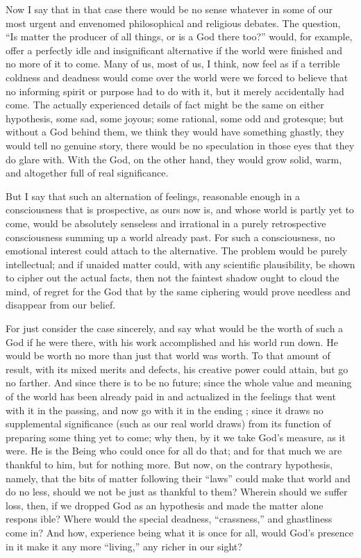 \documentclass[]{article}
\begin{document}
Now I say that in that case there would be no sense whatever in some of our most urgent and envenomed philosophical and religious debates. The question, ``Is matter the producer of all things, or is a God there too?'' would, for example, offer a perfectly idle and insignificant alternative if the world were finished and no more of it to come. Many of us, most of us, I think, now feel as if a terrible coldness and deadness would come over the world were we forced to believe that no informing spirit or purpose had to do with it, but it merely accidentally had come. The actually experienced details of fact might be the same on either hypothesis, some sad, some joyous; some rational, some odd and grotesque; but without a God behind them, we think they would have something ghastly, they would tell no genuine story, there would be no speculation in those eyes that they do glare with. With the God, on the other hand, they would grow solid, warm, and altogether full of real significance. 

But I say that such an alternation of feelings, reasonable enough in a consciousness that is prospective, as ours now is, and whose world is partly yet to come, would be absolutely senseless and irrational in a purely retrospective consciousness summing up a world already past. For such a consciousness, no emotional interest could attach to the alternative. The problem would be purely intellectual; and if unaided matter could, with any scientific plausibility, be shown to cipher out the actual facts, then not the faintest shadow ought to cloud the mind, of regret for the God that by the same ciphering would prove needless and disappear from our belief. 

For just consider the case sincerely, and say what would be the worth of such a God if he were there, with his work accomplished and his world run down. He would be worth no more than just that world was worth. To that amount of result, with its mixed merits and defects, his creative power could attain, but go no farther. And since there is to be no future; since the whole value and meaning of the world has been already paid in and actualized in the feelings that went with it in the passing, and now go with it in the ending ; since it draws no supplemental significance (such as our real world draws) from its function of preparing some thing yet to come; why then, by it we take God's measure, as it were. He is the Being who could once for all do that; and for that much we are thankful to him, but for nothing more. But now, on the contrary hypothesis, namely, that the bits of matter following their ``laws'' could make that world and do no less, should we not be just as thankful to them? Wherein should we suffer loss, then, if we dropped God as an hypothesis and made the matter alone respons ible? Where would the special deadness, ``crassness,'' and ghastliness come in? And how, experience being what it is once for all, would God's presence in it make it any more ``living,'' any richer in our sight? 
\end{document}
